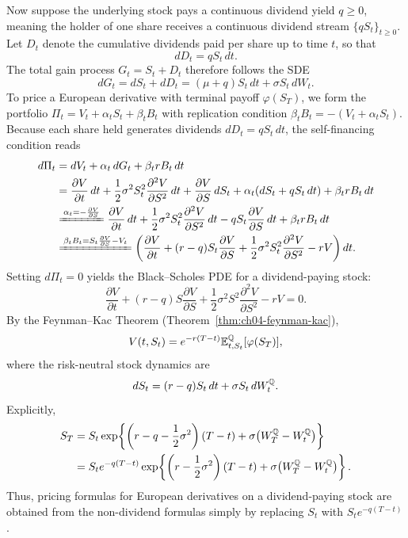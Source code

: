 Now suppose the underlying stock pays a continuous dividend yield $q \ge 0$, meaning the holder of one share receives a continuous dividend stream $\{q S_t\}_{t \ge 0}$. Let $D_t$ denote the cumulative dividends paid per share up to time $t$, so that
\[
    dD_t = q S_t\,dt.
\]
The total gain process $G_t = S_t + D_t$ therefore follows the SDE
\[
    dG_t = dS_t + dD_t = (\mu + q) S_t\,dt + \sigma S_t\,dW_t.
\]
To price a European derivative with terminal payoff $\varphi(S_T)$, we form the portfolio $\Pi_t = V_t + \alpha_t S_t + \beta_t B_t$ with replication condition $\beta_t B_t = -(V_t + \alpha_t S_t)$. Because each share held generates dividends $dD_t = q S_t\,dt$, the self-financing condition reads
\begin{align*}
    d\Pi_t
    &= dV_t + \alpha_t\,dG_t + \beta_t r B_t\,dt \\
    &= \frac{\partial V}{\partial t}\,dt + \frac{1}{2}\sigma^2 S_t^2 \frac{\partial^2 V}{\partial S^2}\,dt + \frac{\partial V}{\partial S}\,dS_t + \alpha_t(dS_t + q S_t\,dt) + \beta_t r B_t\,dt \\
    &\xlongequal{\alpha_t = -\frac{\partial V}{\partial S}}
    \frac{\partial V}{\partial t}\,dt + \frac{1}{2}\sigma^2 S_t^2 \frac{\partial^2 V}{\partial S^2}\,dt - q S_t \frac{\partial V}{\partial S}\,dt + \beta_t r B_t\,dt \\
    &\xlongequal{\beta_t B_t = S_t \frac{\partial V}{\partial S} - V_t}
    \left(\frac{\partial V}{\partial t} + (r - q) S_t \frac{\partial V}{\partial S} + \frac{1}{2}\sigma^2 S_t^2 \frac{\partial^2 V}{\partial S^2} - r V\right)dt.
\end{align*}
Setting $d\Pi_t = 0$ yields the Black--Scholes PDE for a dividend-paying stock:
\[
    \frac{\partial V}{\partial t} + (r - q) S \frac{\partial V}{\partial S} + \frac{1}{2}\sigma^2 S^2 \frac{\partial^2 V}{\partial S^2} - r V = 0.
\]
By the Feynman--Kac Theorem (Theorem~\ref{thm:ch04-feynman-kac}),
\[
    V(t, S_t) = e^{-r(T-t)}\mathbb{E}_{t, S_t}^{\mathbb{Q}}[\varphi(S_T)],
\]
where the risk-neutral stock dynamics are
\[
    dS_t = (r - q) S_t\,dt + \sigma S_t\,dW_t^{\mathbb{Q}}.
\]
Explicitly,
\begin{align*}
    S_T &= S_t \exp\!\left\{\left(r - q - \frac{1}{2}\sigma^2\right)(T - t) + \sigma\bigl(W_T^{\mathbb{Q}} - W_t^{\mathbb{Q}}\bigr)\right\} \\
    &= S_t e^{-q(T-t)} \exp\!\left\{\left(r - \frac{1}{2}\sigma^2\right)(T - t) + \sigma\bigl(W_T^{\mathbb{Q}} - W_t^{\mathbb{Q}}\bigr)\right\}.
\end{align*}
Thus, pricing formulas for European derivatives on a dividend-paying stock are obtained from the non-dividend formulas simply by replacing $S_t$ with $S_t e^{-q(T-t)}$.

